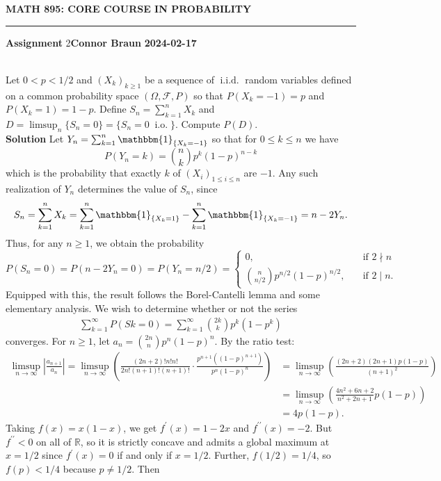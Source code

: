 \documentclass[10pt]{article}
\newcommand{\bp}[1]{\left({#1}\right)}
\newcommand{\mbb}[1]{\mathbb{#1}}
\newcommand{\1}[1]{\mathbbm{1}_{#1}}
\newcommand{\mc}[1]{\mathcal{#1}}
\newcommand{\nck}[2]{{#1\choose#2}}
\DeclareMathOperator{\io}{i.o.}
\DeclareMathOperator{\iid}{i.i.d.}
\begin{document}
    \begin{center}
        {\bf\large{MATH 895: CORE COURSE IN PROBABILITY}}
        \smallskip
        \hrule
        \smallskip
        {\bf Assignment} 2\hfill {\bf Connor Braun} \hfill {\bf 2024-02-17}
    \end{center}
    \\[5pt]
    Let $0<p<1/2$  and $(X_k)_{k\geq 1}$ be a sequence of $\iid$ random variables defined on a common probability space $(\Omega,\mc{F},P)$ so that $P(X_k=-1)=p$ and $P(X_k=1)=1-p$. Define $S_n=\sum_{k=1}^nX_k$ and $D=\limsup_n\{S_n=0\}=\{S_n=0\;\io\}$. Compute $P(D)$.\\[5pt]
    {\bf Solution}\hspace{5pt}
    Let $Y_n=\sum_{k=1}^n\1{\{X_k=-1\}}$ so that for $0\leq k\leq n$ we have
    \[P(Y_n=k)=\nck{n}{k}p^k(1-p)^{n-k}\]
    which is the probability that exactly $k$ of $(X_i)_{1\leq i\leq n}$ are $-1$. Any such realization of $Y_n$ determines the value of $S_n$, since
    \[S_n=\sum_{k=1}^n X_k=\sum_{k=1}^n\1{\{X_k=1\}}-\sum_{k=1}^n\1{\{X_k=-1\}}=n-2Y_n.\]
    Thus, for any $n\geq 1$, we obtain the probability
    \[P(S_n=0)=P(n-2Y_n=0)=P(Y_n=n/2)=\begin{cases}
        0,\quad&\text{if $2\nmid n$}\\
        \nck{n}{n/2}p^{n/2}(1-p)^{n/2},\quad&\text{if $2\mid n$}.
    \end{cases}\]
    Equipped with this, the result follows the Borel-Cantelli lemma and some elementary analysis. We wish to determine whether or not the series
    \begin{align*}
        \sum_{k=1}^\infty P(Sk=0)=\sum_{k=1}^\infty\nck{2k}{k}p^k(1-p^k)
    \end{align*}
    converges. For $n\geq 1$, let $a_n=\nck{2n}{n}p^n(1-p)^n$. By the ratio test:
    \begin{align*}
        \limsup_{n\rightarrow\infty}\left|\frac{a_{n+1}}{a_n}\right|=\limsup_{n\rightarrow\infty}\bp{\frac{(2n+2)!n!n!}{2n!(n+1)!(n+1)!}\cdot\frac{p^{n+1}((1-p)^{n+1})}{p^n(1-p)^{n}}}&=\limsup_{n\rightarrow\infty}\bp{\frac{(2n+2)(2n+1)p(1-p)}{(n+1)^2}}\\
        &=\limsup_{n\rightarrow\infty}\bp{\frac{4n^2+6n+2}{n^2+2n+1}p(1-p)}\\
        &=4p(1-p).
    \end{align*}
    Taking $f(x)=x(1-x)$, we get $f^\prime(x)=1-2x$ and $f^{\prime\prime}(x)=-2$. But $f^{\prime\prime}<0$ on all of $\mbb{R}$, so it is strictly concave and admits a global maximum at $x=1/2$ since $f^\prime(x)=0$ if and only if $x=1/2$. Further, $f(1/2)=1/4$, so $f(p)<1/4$ because $p\neq 1/2$. Then
\end{document}
